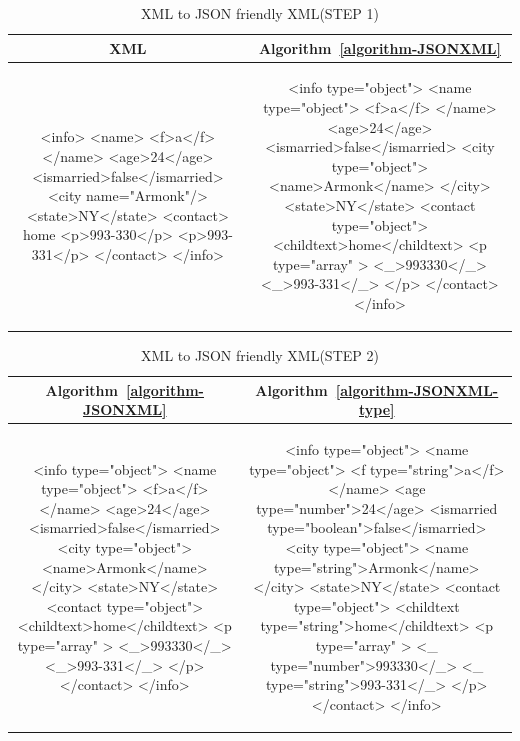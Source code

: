 \documentclass[a4paper,12pt]{article}
\begin{document}
\begin{longtable}{c|c}
	\caption{XML to JSON friendly XML(STEP 1)}
	\label{tbl:xmljson}\\
	\textbf{XML} & \textbf{ Algorithm~\ref{algorithm-JSONXML} }\\
	\hline
\begin{minipage}{.4\textwidth}
\begin{fakeXML}
<info>
  <name>
    <f>a</f>
  </name>
  <age>24</age>
  <ismarried>false</ismarried>
  <city name="Armonk"/>
  <state>NY</state>
  <contact>
	 home
    <p>993-330</p>
    <p>993-331</p>
  </contact>
</info>
\end{fakeXML}	
\end{minipage} &
\begin{minipage}{.55\textwidth}
\begin{fakeXML}
<info type="object">
  <name type="object">
    <f>a</f>
  </name>
  <age>24</age>
  <ismarried>false</ismarried>
  <city type="object">
    <name>Armonk</name>
  </city>
  <state>NY</state>
  <contact type="object">
	<childtext>home</childtext>
    <p  type="array" >
	   <_>993330</_>
	   <_>993-331</_>
    </p>
  </contact>
</info>
\end{fakeXML}
\end{minipage}\\
\end{longtable}

\begin{longtable}{c|c}
	\caption{XML to JSON friendly XML(STEP 2)}
	\label{tbl:xmljson-2}\\
	\textbf{Algorithm~\ref{algorithm-JSONXML}} & \textbf{ Algorithm~\ref{algorithm-JSONXML-type} }\\
	\hline
\begin{minipage}{.4\textwidth}
\begin{fakeXML}
<info type="object">
  <name type="object">
    <f>a</f>
  </name>
  <age>24</age>
  <ismarried>false</ismarried>
  <city type="object">
    <name>Armonk</name>
  </city>
  <state>NY</state>
  <contact type="object">
	 <childtext>home</childtext>
    <p  type="array" >
	   <_>993330</_>
	   <_>993-331</_>
    </p>
  </contact>
</info>
\end{fakeXML}	
\end{minipage} &
\begin{minipage}{.55\textwidth}
\begin{fakeXML}
<info type="object">
  <name type="object">
    <f type="string">a</f>
  </name>
  <age type="number">24</age>
  <ismarried type="boolean">false</ismarried>
  <city type="object">
    <name type="string">Armonk</name>
  </city>
  <state>NY</state>
  <contact type="object">
	 <childtext type="string">home</childtext>
    <p  type="array" >
	   <_ type="number">993330</_>
	   <_ type="string">993-331</_>
    </p>
  </contact>
</info>
\end{fakeXML}
\end{minipage}\\
\end{longtable}
\end{document}
